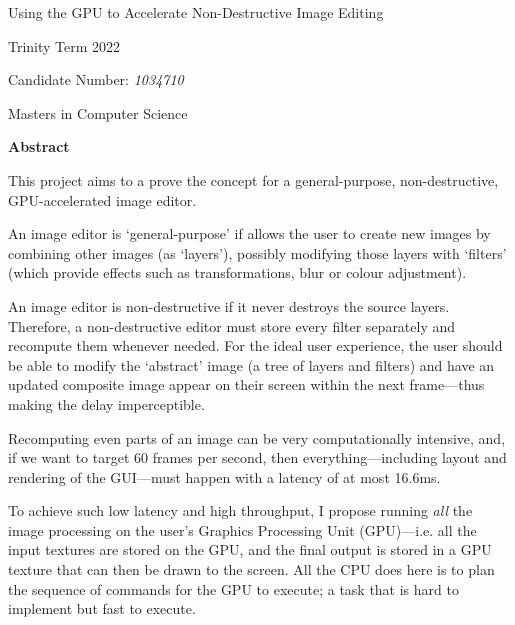 \documentclass[12pt]{article}
\begin{document}
\begin{titlepage}
    \begin{center}
        \vspace*{1.5in}

        \Huge
        Using the GPU to Accelerate Non-Destructive Image Editing

        \vspace*{2in}

        \Large

        Trinity Term 2022

        \vspace*{0.25in}
        Candidate Number: \emph{1034710}

        \vspace*{0.25in}
        Masters in Computer Science
    \end{center}
\end{titlepage}



\begin{center}
    \large \textbf{Abstract}
\end{center}

This project aims to a prove the concept for a general-purpose, non-destructive, GPU-accelerated
image editor.

An image editor is `general-purpose' if allows the user to create new images by combining other
images (as `layers'), possibly modifying those layers with `filters' (which provide effects such as
transformations, blur or colour adjustment).

An image editor is non-destructive if it never destroys the source layers.  Therefore, a
non-destructive editor must store every filter separately and recompute them whenever needed.  For
the ideal user experience, the user should be able to modify the `abstract' image (a tree of layers
and filters) and have an updated composite image appear on their screen within the next frame---thus
making the delay imperceptible.

Recomputing even parts of an image can be very computationally intensive, and, if we want to target
60 frames per second, then everything---including layout and rendering of the GUI---must happen with
a latency of at most 16.6ms.

To achieve such low latency and high throughput, I propose running \emph{all} the image processing
on the user's Graphics Processing Unit (GPU)---i.e. all the input textures are stored on the GPU,
and the final output is stored in a GPU texture that can then be drawn to the screen.  All the CPU
does here is to plan the sequence of commands for the GPU to execute; a task that is hard to
implement but fast to execute.
\end{document}
